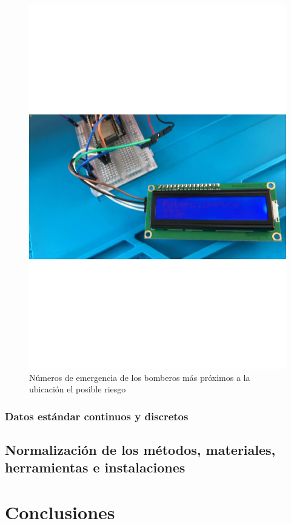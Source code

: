     \begin{figure}[H]
        \centering
        \includegraphics[scale=0.45]{9/Img/lectura.pdf}
        \caption{Números de emergencia de los bomberos más próximos a la ubicación el posible riesgo}
    \end{figure}
    \subsubsection{Datos estándar continuos y discretos}
    \subsection{Normalización de los métodos, materiales, herramientas e instalaciones}
    
    \section{Conclusiones}
    
